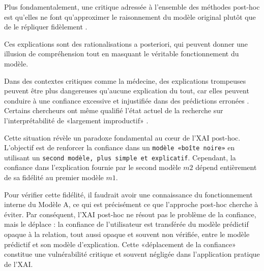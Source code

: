 Plus fondamentalement, une critique adressée à l'ensemble des méthodes post-hoc est qu'elles ne font qu'approximer le raisonnement du modèle original plutôt que de le répliquer fidèlement \citep{Rudin2019, Lipton2018}. 

Ces explications sont des rationalisations a posteriori, qui peuvent donner une illusion de compréhension tout en masquant le véritable fonctionnement du modèle. 

Dans des contextes critiques comme la médecine, des explications trompeuses peuvent être plus dangereuses qu'aucune explication du tout, car elles peuvent conduire à une confiance excessive et injustifiée dans des prédictions erronées \citet{Ghassemi2021The}. Certains chercheurs ont même qualifié l'état actuel de la recherche sur l'interprétabilité de «largement improductif» \citet{Räuker2023}.

Cette situation révèle un paradoxe fondamental au cœur de l'XAI post-hoc. L'objectif est de renforcer la confiance dans un \texttt{modèle «boîte noire»} en utilisant un \texttt{second modèle, plus simple et explicatif}. Cependant, la confiance dans l'explication fournie par le second modèle $m2$ dépend entièrement de sa fidélité au premier modèle $m1$. 

Pour vérifier cette fidélité, il faudrait avoir une connaissance du fonctionnement interne du Modèle A, ce qui est précisément ce que l'approche post-hoc cherche à éviter. Par conséquent, l'XAI post-hoc ne résout pas le problème de la confiance, mais le déplace : la confiance de l'utilisateur est transférée du modèle prédictif opaque à la relation, tout aussi opaque et souvent non vérifiée, entre le modèle prédictif et son modèle d'explication. Cette «déplacement de la confiance» constitue une vulnérabilité critique et souvent négligée dans l'application pratique de l'XAI.
